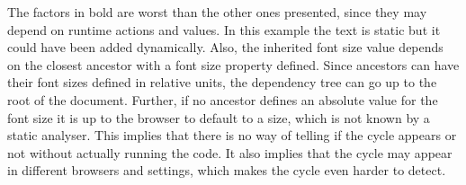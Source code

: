 \documentclass[a4paper,11pt]{kth-mag}
\newcommand{\code}[1]{\texttt{#1}}
\begin{document}
        The factors in bold are worst than the other ones presented, since they may depend on runtime actions and values.
        In this example the text is static but it could have been added dynamically.
        Also, the inherited font size value depends on the closest ancestor with a font size property defined.
        Since ancestors can have their font sizes defined in relative units, the dependency tree can go up to the root of the \gls{document}.
        Further, if no ancestor defines an absolute value for the font size it is up to the \gls{browser} to default to a size, which is not known by a static analyser.
        This implies that there is no way of telling if the cycle appears or not without actually running the code.
        It also implies that the cycle may appear in different \glspl{browser} and settings, which makes the cycle even harder to detect.


\end{document}
